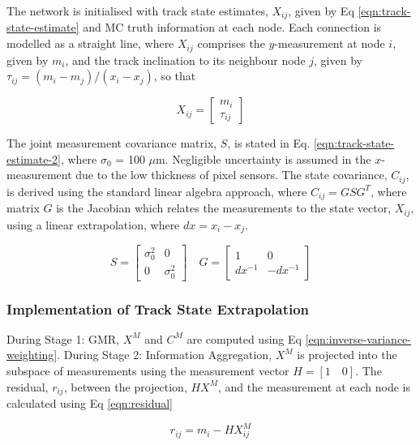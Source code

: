 The network is initialised with track state estimates, $X_{ij}$, given by Eq \eqref{eqn:track-state-estimate} and MC truth information at each node. Each connection is modelled as a straight line, where $X_{ij}$ comprises the $y$-measurement at node $i$, given by $m_i$, and the track inclination to its neighbour node $j$, given by $\tau_{ij} = (m_i - m_j) / (x_i - x_j)$, so that

\begin{equation}
X_{ij} = \begin{bmatrix} m_i \\ \tau_{ij} \end{bmatrix}
\label{eqn:track-state-estimate}
\end{equation}


The joint measurement covariance matrix, $S$, is stated in Eq. \eqref{eqn:track-state-estimate-2}, where $\sigma_0$ = 100 $\mu$m. Negligible uncertainty is assumed in the $x$-measurement due to the low thickness of pixel sensors. The state covariance, $C_{ij}$, is derived using the standard linear algebra approach, where $C_{ij} = GSG^T$, where matrix $G$ is the Jacobian which relates the measurements to the state vector, $X_{ij}$, using a linear extrapolation, where $dx = x_i - x_j$.  

\begin{equation}
S = \begin{bmatrix} \sigma_0^{2} & 0 \\ 0 & \sigma_0^{2} \end{bmatrix}  \quad G = \begin{bmatrix} 1 & 0 \\ dx^{-1} & -dx^{-1}  \end{bmatrix}
\label{eqn:track-state-estimate-2}
\end{equation}


\subsubsection{Implementation of Track State Extrapolation}

During Stage 1: GMR, $X^{M}$ and $C^{M}$ are computed using Eq \eqref{eqn:inverse-variance-weighting}. During Stage 2: Information Aggregation, $X^M$ is projected into the subspace of measurements using the measurement vector $H = [1 \quad 0]$. The residual, $r_{ij}$, between the projection, $HX^M$, and the measurement at each node is calculated using Eq \eqref{eqn:residual}

\begin{equation}
r_{ij} = m_i - HX_{ij}^M
\label{eqn:residual}
\end{equation}

